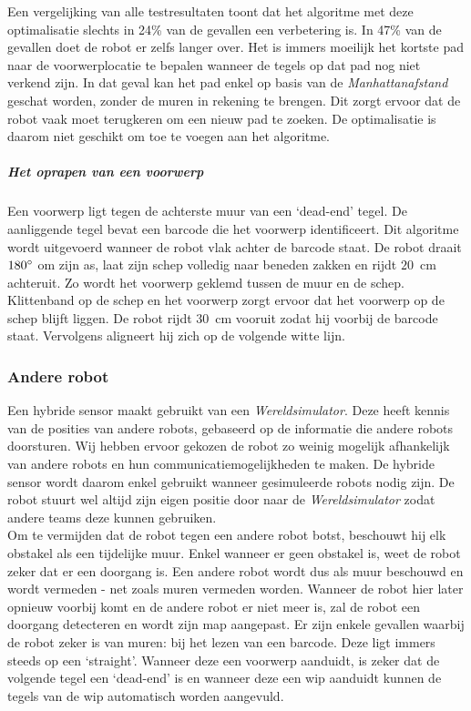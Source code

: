 \documentclass[eind]{penoverslag}
\begin{document}
Een vergelijking van alle testresultaten toont dat het algoritme met deze optimalisatie slechts in 24\% van de gevallen een verbetering is. In 47\% van de gevallen doet de robot er zelfs langer over. Het is immers moeilijk het kortste pad naar de voorwerplocatie te bepalen wanneer de tegels op dat pad nog niet verkend zijn. In dat geval kan het pad enkel op basis van de \textit{Manhattanafstand} geschat worden, zonder de muren in rekening te brengen. Dit zorgt ervoor dat de robot vaak moet terugkeren om een nieuw pad te zoeken. De optimalisatie is daarom niet geschikt om toe te voegen aan het algoritme. \\

\subparagraph{Het oprapen van een voorwerp}
Een voorwerp ligt tegen de achterste muur van een `dead-end' tegel. De aanliggende tegel bevat een barcode die het voorwerp identificeert. Dit algoritme wordt uitgevoerd wanneer de robot vlak achter de barcode staat. De robot draait $180\degree$ om zijn as, laat zijn schep volledig naar beneden zakken en rijdt $20$~cm achteruit. Zo wordt het voorwerp geklemd tussen de muur en de schep. Klittenband op de schep en het voorwerp zorgt ervoor dat het voorwerp op de schep blijft liggen. De robot rijdt $30$~cm vooruit zodat hij voorbij de barcode staat. Vervolgens aligneert hij zich op de volgende witte lijn.

\subsubsection{Andere robot}
\label{sssec:AlgoCollision}
Een hybride sensor maakt gebruikt van een \textit{Wereldsimulator}. Deze heeft kennis van de posities van andere robots, gebaseerd op de informatie die andere robots doorsturen. Wij hebben ervoor gekozen de robot zo weinig mogelijk afhankelijk van andere robots en hun communicatiemogelijkheden te maken. De hybride sensor wordt daarom enkel gebruikt wanneer gesimuleerde robots nodig zijn. De robot stuurt wel altijd zijn eigen positie door naar de \textit{Wereldsimulator} zodat andere teams deze kunnen gebruiken.\\

Om te vermijden dat de robot tegen een andere robot botst, beschouwt hij elk obstakel als een tijdelijke muur. Enkel wanneer er geen obstakel is, weet de robot zeker dat er een doorgang is. Een andere robot wordt dus als muur beschouwd en wordt vermeden - net zoals muren vermeden worden. Wanneer de robot hier later opnieuw voorbij komt en de andere robot er niet meer is, zal de robot een doorgang detecteren en wordt zijn map aangepast. Er zijn enkele gevallen waarbij de robot zeker is van muren: bij het lezen van een barcode. Deze ligt immers steeds op een `straight'. Wanneer deze een voorwerp aanduidt, is zeker dat de volgende tegel een `dead-end' is en wanneer deze een wip aanduidt kunnen de tegels van de wip automatisch worden aangevuld. \\
\end{document}
